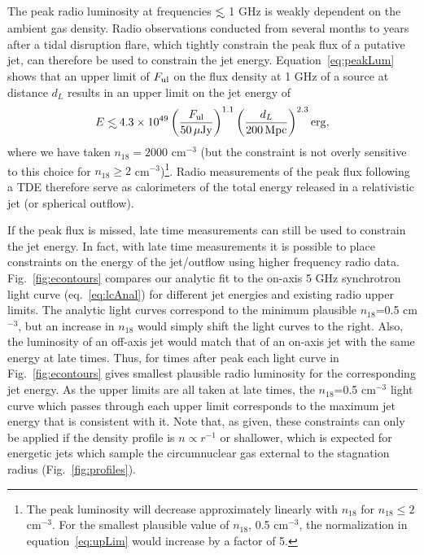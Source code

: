 \documentclass[usenatbib,fleqn]{mnras}
\newcommand\lsim{\mathrel{\rlap{\lower4pt\hbox{\hskip1pt$\sim$}}
    \raise1pt\hbox{$<$}}}
\begin{document}
The peak radio luminosity at frequencies $\lsim$ 1 GHz is weakly
dependent on the ambient gas density. Radio observations conducted
from several months to years after a tidal disruption flare, which
tightly constrain the peak flux of a putative jet, can therefore be
used to constrain the jet energy.  Equation~\eqref{eq:peakLum} shows
that an upper limit of $F_{\rm ul}$ on the flux density at 1 GHz of a
source at distance $d_L$ results in an upper limit on the jet energy
of
\begin{equation}
  E\lsim 4.3 \times 10^{49} \left(\frac{F_{\rm ul}}{50 \,\mu{\rm Jy}}\right)^{1.1}
  \left(\frac{d_L}{200 \,{\rm Mpc}}\right)^{2.3} {\rm erg},
\label{eq:upLim}
\end{equation}
%
where we have taken $n_{18}=2000$ cm$^{-3}$ (but the constraint is not
overly sensitive to this choice for $n_{18}\geq 2$
cm$^{-3}$)\footnote{The peak luminosity will decrease approximately
  linearly with $n_{18}$ for $n_{18}\leq 2$ cm$^{-3}$.  For the
  smallest plausible value of $n_{18}$, 0.5 cm$^{-3}$, the
  normalization in equation~\eqref{eq:upLim} would increase by a
  factor of 5.}.  Radio measurements of the peak flux following a TDE
therefore serve as calorimeters of the total energy released in a
relativistic jet (or spherical outflow).

If the peak flux is missed, late time measurements can still be used
to constrain the jet energy. In fact, with late time measurements it
is possible to place constraints on the energy of the jet/outflow
using higher frequency radio data. Fig.~\ref{fig:econtours} compares
our analytic fit to the on-axis 5 GHz synchrotron light curve
(eq.~\ref{eq:lcAnal}) for different jet energies and existing radio
upper limits. The analytic light curves correspond to the minimum
plausible $n_{18}$=0.5 cm$^{-3}$, but an increase in $n_{18}$ would
simply shift the light curves to the right. Also, the luminosity of an
off-axis jet would match that of an on-axis jet with the same energy
at late times. Thus, for times after peak each light curve in
Fig.~\ref{fig:econtours} gives smallest plausible radio
luminosity for the corresponding jet energy. As the upper limits are
all taken at late times, the $n_{18}$=0.5 cm$^{-3}$ light curve which
passes through each upper limit corresponds to the maximum jet energy
that is consistent with it.  Note that, as given, these constraints
can only be applied if the density profile is $n\propto r^{-1}$ or
shallower, which is expected for energetic jets which sample the
circumnuclear gas external to the stagnation radius
(Fig.~\ref{fig:profiles}).
\end{document}
